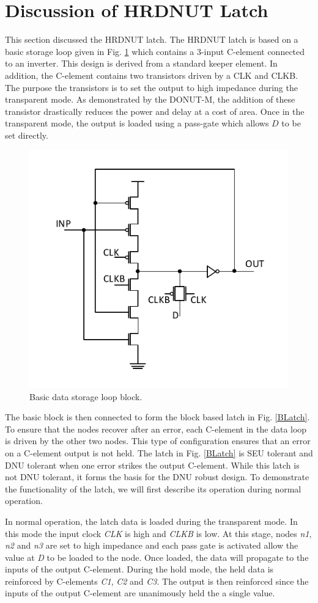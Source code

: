 \section{Discussion of HRDNUT Latch} \label{Proposed}
This section discussed the HRDNUT latch. The HRDNUT latch is based on a basic storage loop given in Fig. \ref{Block} which contains a 3-input C-element connected to an inverter. This design is derived from a standard keeper element. In addition, the C-element contains two transistors driven by a CLK and CLKB. The purpose the transistors is to set the output to high impedance during the transparent mode. As demonstrated by the DONUT-M, the addition of these transistor drastically reduces the power and delay at a cost of area. Once in the transparent mode, the output is loaded using a pass-gate which allows $D$ to be set directly.     

\begin{figure}[h]
	\centering
	\includegraphics[width=0.5\linewidth]{Figures/Block}
	\caption{Basic data storage loop block.}
	\label{Block}
\end{figure} 

The basic block is then connected to form the block based latch in Fig. \ref{BLatch}. To ensure that the nodes recover after an error, each C-element in the data loop is driven by the other two nodes. This type of configuration ensures that an error on a C-element output is not held. The latch in Fig. \ref{BLatch} is SEU tolerant and DNU tolerant when one error strikes the output C-element. While this latch is not DNU tolerant, it forms the basis for the DNU robust design. To demonstrate the functionality of the latch, we will first describe its operation during normal operation.

In normal operation, the latch data is loaded during the transparent mode. In this mode the input clock \textit{CLK} is high and \textit{CLKB} is low. At this stage, nodes \textit{n1}, \textit{n2} and \textit{n3} are set to high impedance and each pass gate is activated allow the value at \textit{D} to be loaded to the node. Once loaded, the data will propagate to the inputs of the output C-element. During the hold mode, the held data is reinforced by C-elements \textit{C1}, \textit{C2} and \textit{C3}. The output is then reinforced since the inputs of the output C-element are unanimously held the a single value.

